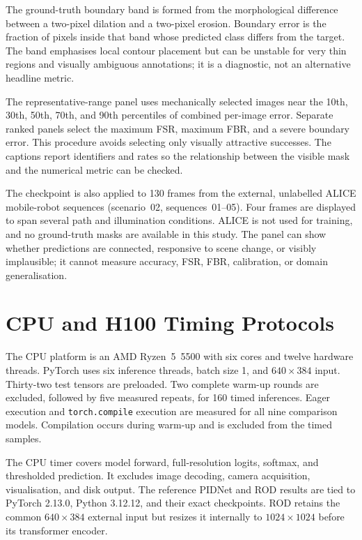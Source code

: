 The ground-truth boundary band is formed from the morphological difference
between a two-pixel dilation and a two-pixel erosion. Boundary error is the
fraction of pixels inside that band whose predicted class differs from the
target. The band emphasises local contour placement but can be unstable for
very thin regions and visually ambiguous annotations; it is a diagnostic, not
an alternative headline metric.

The representative-range panel uses mechanically selected images near the
10th, 30th, 50th, 70th, and 90th percentiles of combined per-image error.
Separate ranked panels select the maximum FSR, maximum FBR, and a severe
boundary error. This procedure avoids selecting only visually attractive
successes. The captions report identifiers and rates so the relationship
between the visible mask and the numerical metric can be checked.

The checkpoint is also applied to 130 frames from the external, unlabelled
ALICE mobile-robot sequences (scenario~02, sequences~01--05). Four frames are
displayed to span several path and illumination conditions. ALICE is not used
for training, and no ground-truth masks are available in this study. The panel
can show whether predictions are connected, responsive to scene change, or
visibly implausible; it cannot measure accuracy, FSR, FBR, calibration, or
domain generalisation.

\section{CPU and H100 Timing Protocols}

The CPU platform is an AMD Ryzen~5~5500 with six cores and twelve hardware
threads. PyTorch uses six inference threads, batch size 1, and
$640\times384$ input. Thirty-two test tensors are preloaded. Two complete
warm-up rounds are excluded, followed by five measured repeats, for 160 timed
inferences. Eager execution and \texttt{torch.compile} execution are measured
for all nine comparison models. Compilation occurs during warm-up and is
excluded from the timed samples.

The CPU timer covers model forward, full-resolution logits, softmax, and
thresholded prediction. It excludes image decoding, camera acquisition,
visualisation, and disk output. The reference PIDNet and ROD results are tied
to PyTorch 2.13.0, Python 3.12.12, and their exact checkpoints. ROD retains the
common $640\times384$ external input but resizes it internally to
$1024\times1024$ before its transformer encoder.

